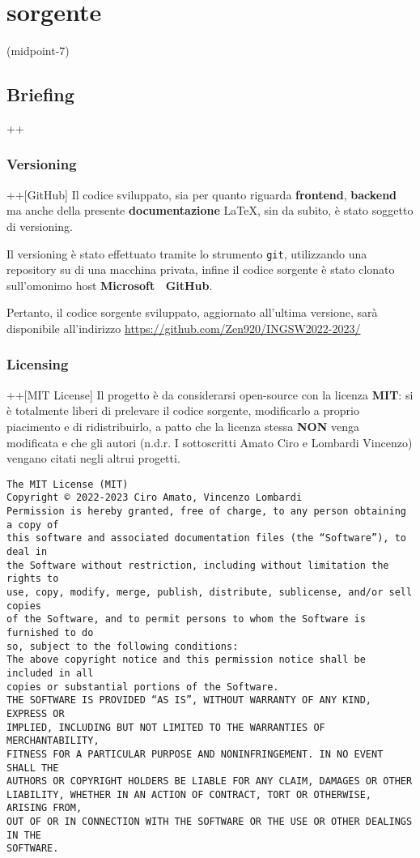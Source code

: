 \chapter[Codice]{sorgente}(midpoint-7)
\section*{Briefing}+\Materialfilecopy+
\subsection*{Versioning}+\IcoMoongithub+[GitHub]
Il codice sviluppato, sia per quanto riguarda \textbf{frontend}, \textbf{backend}
ma anche della presente \textbf{documentazione} \LaTeX, sin da subito, è stato soggetto di versioning.

Il versioning è stato effettuato tramite lo strumento \texttt{git}, utilizzando 
una repository su di una macchina privata, infine il codice sorgente è stato clonato
sull'omonimo host \textbf{Microsoft \IcoMoongithub\ GitHub}.

Pertanto, il codice sorgente sviluppato, aggiornato all'ultima versione, sarà disponibile all'indirizzo\newline
\url{https://github.com/Zen920/INGSW2022-2023/}

\subsection*{Licensing}+\Materialfilecopy+[MIT License]
Il progetto è da considerarsi open-source con la licenza \textbf{MIT}: 
si è totalmente liberi di prelevare il codice sorgente, modificarlo a proprio piacimento
e di ridistribuirlo, a patto che la licenza stessa \textbf{NON} venga
modificata e che gli autori (n.d.r. I sottoscritti Amato Ciro e Lombardi Vincenzo)
vengano citati negli altrui progetti.

\begin{verbatim}
The MIT License (MIT)
Copyright © 2022-2023 Ciro Amato, Vincenzo Lombardi
Permission is hereby granted, free of charge, to any person obtaining a copy of
this software and associated documentation files (the “Software”), to deal in
the Software without restriction, including without limitation the rights to
use, copy, modify, merge, publish, distribute, sublicense, and/or sell copies
of the Software, and to permit persons to whom the Software is furnished to do
so, subject to the following conditions:
The above copyright notice and this permission notice shall be included in all
copies or substantial portions of the Software.
THE SOFTWARE IS PROVIDED “AS IS”, WITHOUT WARRANTY OF ANY KIND, EXPRESS OR
IMPLIED, INCLUDING BUT NOT LIMITED TO THE WARRANTIES OF MERCHANTABILITY,
FITNESS FOR A PARTICULAR PURPOSE AND NONINFRINGEMENT. IN NO EVENT SHALL THE
AUTHORS OR COPYRIGHT HOLDERS BE LIABLE FOR ANY CLAIM, DAMAGES OR OTHER
LIABILITY, WHETHER IN AN ACTION OF CONTRACT, TORT OR OTHERWISE, ARISING FROM,
OUT OF OR IN CONNECTION WITH THE SOFTWARE OR THE USE OR OTHER DEALINGS IN THE
SOFTWARE.
\end{verbatim}

